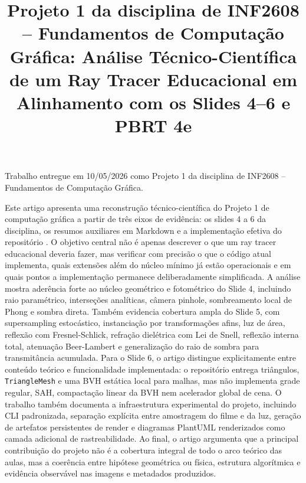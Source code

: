 \documentclass[portuguese]{sbcreviews-2025}%
\title[Projeto 1 de INF2608]{Projeto 1 da disciplina de INF2608 -- Fundamentos de Computação Gráfica: Análise Técnico-Científica de um Ray Tracer Educacional em Alinhamento com os Slides 4--6 e PBRT 4e}
\author[Yang Ricardo Barcellos Miranda]{
\affil{\textbf{Yang Ricardo Barcellos Miranda}~[\href{mailto:ymiranda@inf.puc-rio.br}{\textit{ymiranda@inf.puc-rio.br}}]}
}
\begin{document}
\begin{frontmatter}

\maketitle

\begin{mail}
Trabalho entregue em 10/05/2026 como Projeto 1 da disciplina de INF2608 -- Fundamentos de Computação Gráfica.
\end{mail}


\begin{abstract-pt}
Este artigo apresenta uma reconstrução técnico-científica do Projeto 1 de computação gráfica a partir de três eixos de evidência: os slides 4 a 6 da disciplina, os resumos auxiliares em Markdown e a implementação efetiva do repositório . O objetivo central não é apenas descrever o que um ray tracer educacional deveria fazer, mas verificar com precisão o que o código atual implementa, quais extensões além do núcleo mínimo já estão operacionais e em quais pontos a implementação permanece deliberadamente simplificada. A análise mostra aderência forte ao núcleo geométrico e fotométrico do Slide 4, incluindo raio paramétrico, interseções analíticas, câmera pinhole, sombreamento local de Phong e sombra direta. Também evidencia cobertura ampla do Slide 5, com supersampling estocástico, instanciação por transformações afins, luz de área, reflexão com Fresnel-Schlick, refração dielétrica com Lei de Snell, reflexão interna total, atenuação Beer-Lambert e generalização do raio de sombra para transmitância acumulada. Para o Slide 6, o artigo distingue explicitamente entre conteúdo teórico e funcionalidade implementada: o repositório entrega triângulos, \texttt{TriangleMesh} e uma BVH estática local para malhas, mas não implementa grade regular, SAH, compactação linear da BVH nem acelerador global de cena. O trabalho também documenta a infraestrutura experimental do projeto, incluindo CLI padronizada, separação explícita entre amostragem do filme e da luz, geração de artefatos persistentes de render e diagramas PlantUML renderizados como camada adicional de rastreabilidade. Ao final, o artigo argumenta que a principal contribuição do projeto não é a cobertura integral de todo o arco teórico das aulas, mas a coerência entre hipótese geométrica ou física, estrutura algorítmica e evidência observável nas imagens e metadados produzidos.
\end{abstract-pt}


\end{frontmatter}
\end{document}
